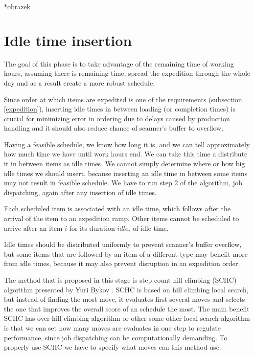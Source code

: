 \documentclass{ctuthesis}
\begin{document}
*obrazek

\section{Idle time insertion}

The goal of this phase is to take advantage of the remaining time of working hours, assuming there is remaining time, spread the expedition through the whole day and as a result create a more robust schedule. 

Since order at which items are expedited is one of the requirements (subsection \ref{expedition}), inserting idle times in between loading (or completion times) is crucial for minimizing error in ordering due to delays caused by production handling and it should also reduce chance of scanner's buffer to overflow.

Having a feasible schedule, we know how long it is, and we can tell approximately how much time we have until work hours end. We can take this time a distribute it in between items as idle times. We cannot simply determine where or how big idle times we should insert, because inserting an idle time in between some items may not result in feasible schedule. We have to run step 2 of the algorithm, job dispatching, again after any insertion of idle times.

Each scheduled item is associated with an idle time, which follows after the arrival of the item to an expedition ramp. Other items cannot be scheduled to arrive after an item $i$ for its duration $idle_i$ of idle time.

Idle times should be distributed uniformly to prevent scanner's buffer overflow, but some items that are followed by an item of a different type may benefit more from idle times, because it may also prevent disruption in an expedition order.

The method that is proposed in this stage is step count hill climbing (SCHC) algorithm presented by Yuri Bykov \cite{yuri}. SCHC is based on hill climbing local search, but instead of finding the most move, it evaluates first several moves and selects the one that improves the overall score of an schedule the most. The main benefit SCHC has over hill climbing algorithm or other some other local search algorithm is that we can set how many moves are evaluates in one step to regulate performance, since job dispatching can be computationally demanding. To properly use SCHC we have to specify what moves can this method use. 
\end{document}
